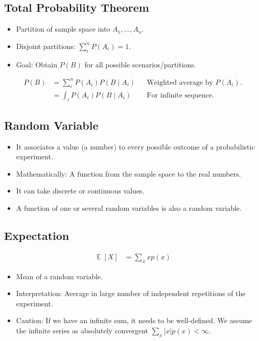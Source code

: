 \documentclass{article}
\newcommand{\given}{\mid}
\DeclareMathOperator{\E}{\mathbb{E}}
\begin{document}
\subsection{Total Probability Theorem}

\begin{itemize}
    \item Partition of sample space into $A_1, \dots, A_n$.
    \item Disjoint partitions: $\sum_i^n P(A_i) = 1$.
    \item Goal: Obtain $P(B)$ for all possible scenarios/partitions.
\end{itemize}

\begin{align*}
    P(B) &= \sum_i^n P(A_i) P(B \given A_i) && \text{Weighted average by $P(A_i)$.} \\
         &= \int_i P(A_i) P(B \given A_i) && \text{For infinite sequence.}
\end{align*}

\subsection{Random Variable}

\begin{itemize}
    \item It associates a value (a number) to every possible outcome of a probabilistic experiment.
    \item Mathematically: A function from the sample space to the real numbers.
    \item It can take discrete or continuous values.
    \item A function of one or several random variables is also a random variable.
\end{itemize}

\subsection{Expectation}

\begin{align*}
    \E[X] &= \sum_x x p(x)
\end{align*}

\begin{itemize}
    \item Mean of a random variable.
    \item Interpretation: Average in large number of independent repetitions of the experiment.
    \item Caution: If we have an infinite sum, it needs to be well-defined. 
          We assume the infinite series as absolutely convergent $\sum_x |x| p(x) < \infty$.
\end{itemize}
\end{document}

